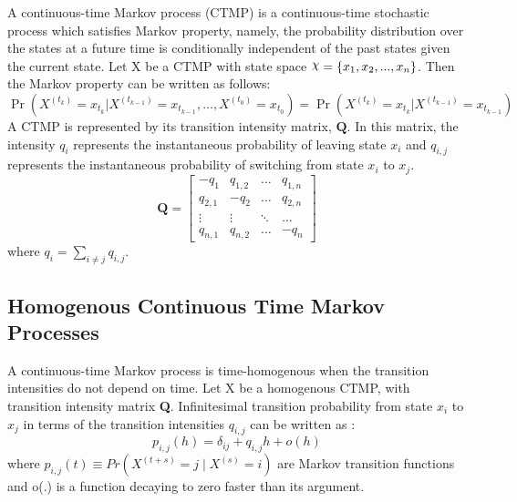 A continuous-time Markov process (CTMP) is a continuous-time stochastic process which satisfies Markov property, namely, the probability distribution over the states at a future time is conditionally independent of the past states given the current state.\cite{Cohn2010a} Let X be a CTMP with state space $ \rchi = \left\lbrace x_{1}, x_{2}, ..., x_{n} \right\rbrace  $. Then the Markov property can be written as follows:
\begin{equation}
	\operatorname{Pr}\left(X^{\left(t_{k}\right)}=x_{t_{k}} | X^{\left(t_{k-1}\right)}=x_{t_{k-1}}, \ldots, X^{\left(t_{0}\right)}=x_{t_{0}}\right)=\operatorname{Pr}\left(X^{\left(t_{k}\right)}=x_{t_{k}} | X^{\left(t_{k-1}\right)}=x_{t_{k-1}}\right)
\end{equation}
A CTMP is represented by its transition intensity matrix, $ \textbf{Q} $. In this matrix, the intensity $ q_{i} $ represents the instantaneous probability of leaving state $ x_{i} $ and $ q_{i,j} $ represents the instantaneous probability of switching from state $ x_{i} $ to $ x_{j} $. 
\begin{equation}
	\textbf{Q} = 
	\begin{bmatrix}
	-q_{1} & q_{1,2} & 	{\hdots}  & q_{1,n} \\
	q_{2,1} & -q_{2} & 	{\hdots}  & q_{2,n}  \\
	{\vdots}  & 	{\vdots}  & 	{\ddots}  & {\hdots}  \\
	q_{n,1} &  q_{n,2} &  {\hdots} & -q_{n}
	\end{bmatrix}
\end{equation}
where $ q_{i} = \sum_{i \neq j} q_{i,j}$.\cite{Nodelman1995}

\subsection{Homogenous Continuous Time Markov Processes}
A continuous-time Markov process is time-homogenous when the transition intensities do not depend on time. Let X be a homogenous CTMP, with transition intensity matrix \textbf{Q}. Infinitesimal transition probability from state $ x_{i} $ to $ x_{j} $ in terms of the transition intensities $ q_{i,j} $ can be written as \cite{Cohn2010a}:
\begin{equation}
p_{i,j}(h)=\delta_{ij}+q_{i,j} h+o(h)
\end{equation}
where $ p_{i, j}(t) \equiv Pr(X^{(t+s)}=j\mid X^{(s)}=i) $ are Markov transition functions and o(.) is a function decaying to zero faster than its argument.

